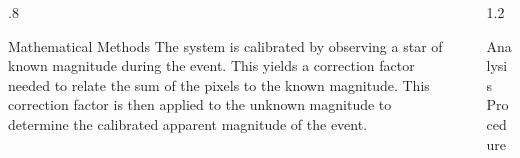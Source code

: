 \documentclass[final]{beamer}
\newlength{\sepwid}
\newlength{\twocolwid}
\begin{document}
\begin{frame}[t]
\begin{columns}[t]
\begin{column}{.8\twocolwid}
\begin{block}{Mathematical Methods}
The system is calibrated by observing a star of known magnitude during the event. This yields a correction factor needed to relate the sum of the pixels to the known magnitude. This correction factor is then applied to the unknown magnitude to determine the calibrated apparent magnitude of the event.


\end{block}

\end{column} %

\begin{column}{\sepwid}\end{column} %

\begin{column}{1.2\twocolwid} %

\begin{alertblock}{Analysis Procedure}


\end{alertblock}
\end{column}
\end{columns}
\end{frame}
\end{document}

